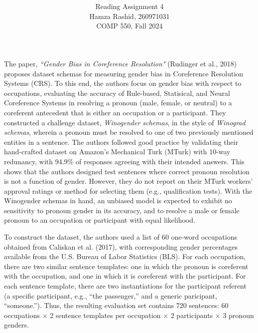 \documentclass[11pt]{article}
\title{ }
\author{ Reading Assignment 4 \\ Hamza Rashid, 260971031 \\ COMP 550, Fall 2024}
\date{}
\begin{document}
\maketitle

\vspace{-4ex}
The paper, \textit{``Gender Bias in Coreference Resolution"} 
(Rudinger et al., 2018) proposes dataset schemas for measuring 
gender bias in Coreference Resolution Systems (CRS). To this end, 
the authors focus on gender bias with respect to occupations, 
evaluating the accuracy of Rule-based, Statisical, and Neural 
Coreference Systems in resolving a pronoun (male, female, or neutral) 
to a coreferent antecedent that is either an occupation or a participant. 
They constructed a challenge dataset, \textit{Winogender schemas}, 
in the style of \textit{Winograd schemas}, wherein a pronoun must be resolved to one of two previously mentioned 
entities in a sentence. The authors followed good practice 
by validating their hand-crafted dataset on Amazon's Mechanical Turk (MTurk) with 10-way
redunancy, with 94.9\% of responses agreeing with their intended answers. This shows that
the authors designed test sentences where correct pronoun resolution is not a function of gender. However,
they do not report on their MTurk workers' approval ratings or method for selecting them 
(e.g., qualification tests). With the Winogender schemas in hand, an unbiased model is expected to
exhibit no sensitivity to pronoun gender in its accuracy, and to resolve a male or female 
pronoun to an occupation or participant with equal likelihood. 


To construct the dataset, the authors 
used a list of 60 one-word occupations obtained from Caliskan et al. (2017), 
with corresponding gender percentages
available from the U.S. Bureau of Labor Statistics (BLS). For each occupation, there are two similar
sentence templates: one in which the pronoun is
coreferent with the occupation, and one in which
it is coreferent with the participant.
For each sentence template, there are two instantiations for the participant referent (a specific
participant, e.g., “the passenger,” and a generic
paricipant, “someone.”). Thus, the resulting evaluation set contains 720 sentences: 60 occupations × 2 sentence templates per
occupation × 2 participants × 3 pronoun genders.
\end{document}
